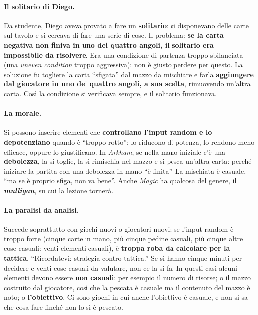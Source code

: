 \paragraph{Il solitario di Diego.} Da studente, Diego aveva provato a fare un
\textbf{solitario}: si disponevano delle carte sul tavolo e si cercava di fare una serie di
cose. Il problema: \textbf{se la carta negativa non finiva in uno dei quattro angoli, il
solitario era impossibile da risolvere}. Era una condizione di partenza troppo sbilanciata
(una \emph{uneven condition} troppo aggressiva): non è giusto perdere per questo. La
soluzione fu togliere la carta ``sfigata'' dal mazzo da mischiare e farla \textbf{aggiungere
dal giocatore in uno dei quattro angoli, a sua scelta}, rimuovendo un'altra carta. Così la
condizione si verificava sempre, e il solitario funzionava.

\paragraph{La morale.} Si possono inserire elementi che \textbf{controllano l'input random e
lo depotenziano} quando è ``troppo rotto'': lo riducono di potenza, lo rendono meno efficace,
oppure lo giustificano. In \emph{Arkham}, se nella mano iniziale c'è una
\textbf{debolezza}, la si toglie, la si rimischia nel mazzo e si pesca un'altra carta:
perché iniziare la partita con una debolezza in mano ``è finita''. La mischiata è casuale,
``ma se è proprio sfiga, non va bene''. Anche \emph{Magic} ha qualcosa del genere, il
\textbf{\emph{mulligan}}, su cui la lezione tornerà.

\paragraph{La paralisi da analisi.} Succede soprattutto con giochi nuovi o giocatori nuovi:
se l'input random è troppo forte (cinque carte in mano, più cinque pedine casuali, più cinque
altre cose casuali: venti elementi casuali), è \textbf{troppa roba da calcolare per la
tattica}. ``Ricordatevi: strategia contro tattica.'' Se si hanno cinque minuti per decidere e
venti cose casuali da valutare, non ce la si fa. In questi casi alcuni elementi devono
essere \textbf{non casuali}: per esempio il numero di risorse; o il mazzo costruito dal
giocatore, così che la pescata è casuale ma il contenuto del mazzo è noto; o
\textbf{l'obiettivo}. Ci sono giochi in cui anche l'obiettivo è casuale, e non si sa che cosa
fare finché non lo si è pescato.

